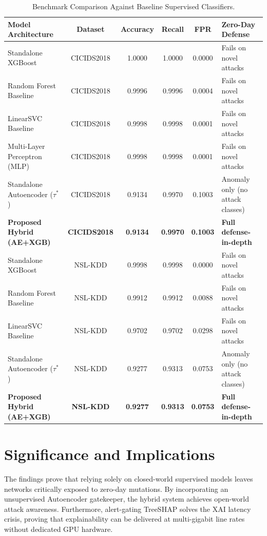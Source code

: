 \documentclass[12pt,a4paper]{report}
\begin{document}
\begin{table}[H]
\centering
\caption{Benchmark Comparison Against Baseline Supervised Classifiers.}
\label{tab:ch6_comparison}
\small
\setlength{\tabcolsep}{3pt}
\renewcommand{\arraystretch}{1.2}
\begin{tabularx}{\textwidth}{|P{0.25\textwidth}|c|c|c|c|Y|}
\hline
\textbf{Model Architecture} & \textbf{Dataset} & \textbf{Accuracy} & \textbf{Recall} & \textbf{FPR} & \textbf{Zero-Day Defense} \\
\hline
Standalone XGBoost & CICIDS2018 & 1.0000 & 1.0000 & 0.0000 & Fails on novel attacks \\
\hline
Random Forest Baseline & CICIDS2018 & 0.9996 & 0.9996 & 0.0004 & Fails on novel attacks \\
\hline
LinearSVC Baseline & CICIDS2018 & 0.9998 & 0.9998 & 0.0001 & Fails on novel attacks \\
\hline
Multi-Layer Perceptron (MLP) & CICIDS2018 & 0.9998 & 0.9998 & 0.0001 & Fails on novel attacks \\
\hline
Standalone Autoencoder ($\tau^*$) & CICIDS2018 & 0.9134 & 0.9970 & 0.1003 & Anomaly only (no attack classes) \\
\hline
\textbf{Proposed Hybrid (AE+XGB)} & \textbf{CICIDS2018} & \textbf{0.9134} & \textbf{0.9970} & \textbf{0.1003} & \textbf{Full defense-in-depth} \\
\hline
\hline
Standalone XGBoost & NSL-KDD & 0.9998 & 0.9998 & 0.0000 & Fails on novel attacks \\
\hline
Random Forest Baseline & NSL-KDD & 0.9912 & 0.9912 & 0.0088 & Fails on novel attacks \\
\hline
LinearSVC Baseline & NSL-KDD & 0.9702 & 0.9702 & 0.0298 & Fails on novel attacks \\
\hline
Standalone Autoencoder ($\tau^*$) & NSL-KDD & 0.9277 & 0.9313 & 0.0753 & Anomaly only (no attack classes) \\
\hline
\textbf{Proposed Hybrid (AE+XGB)} & \textbf{NSL-KDD} & \textbf{0.9277} & \textbf{0.9313} & \textbf{0.0753} & \textbf{Full defense-in-depth} \\
\hline
\end{tabularx}
\end{table}

\section{Significance and Implications}
The findings prove that relying solely on closed-world supervised models leaves networks critically exposed to zero-day mutations. By incorporating an unsupervised Autoencoder gatekeeper, the hybrid system achieves open-world attack awareness. Furthermore, alert-gating TreeSHAP solves the XAI latency crisis, proving that explainability can be delivered at multi-gigabit line rates without dedicated GPU hardware.
\end{document}
